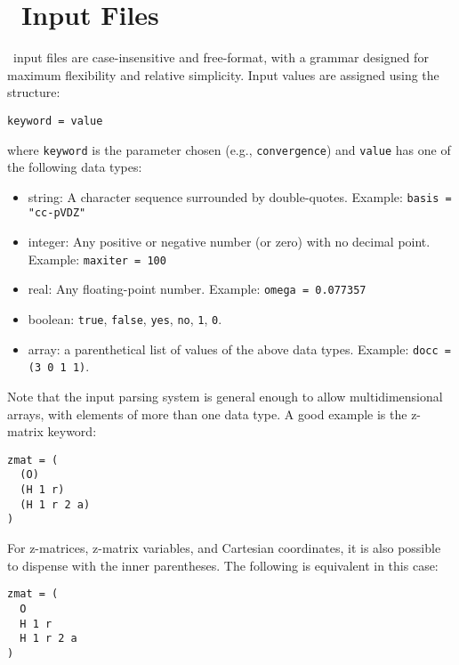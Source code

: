 \section{\PSIthree\ Input Files} \label{input}

\PSIthree\ input files are case-insensitive and free-format, with
a grammar designed for maximum flexibility and relative simplicity.
Input values are assigned using the structure:
\begin{verbatim}
keyword = value
\end{verbatim}
where {\tt keyword} is the parameter chosen (e.g., {\tt convergence})
and {\tt value} has one of the following data types:
\begin{itemize}
\item string: A character sequence surrounded by double-quotes.
  Example: {\tt basis = "cc-pVDZ"}
\item integer: Any positive or negative number (or zero) with no
  decimal point.  Example: {\tt maxiter = 100}
\item real: Any floating-point number.  Example: {\tt omega = 0.077357}
\item boolean: {\tt true}, {\tt false}, {\tt yes}, {\tt no}, {\tt 1},
  {\tt 0}.
\item array: a parenthetical list of values of the above data types.
  Example: {\tt docc = (3 0 1 1)}.  
\end{itemize}
Note that the input parsing system is general enough to allow
multidimensional arrays, with elements of more than one data type.  A
good example is the z-matrix keyword:
\begin{verbatim}
zmat = (
  (O)
  (H 1 r)
  (H 1 r 2 a)
)
\end{verbatim}
For z-matrices, z-matrix variables, and Cartesian coordinates, 
it is also possible to dispense with the inner parentheses.
The following is equivalent in this case:
\begin{verbatim}
zmat = (
  O
  H 1 r
  H 1 r 2 a
)
\end{verbatim}

